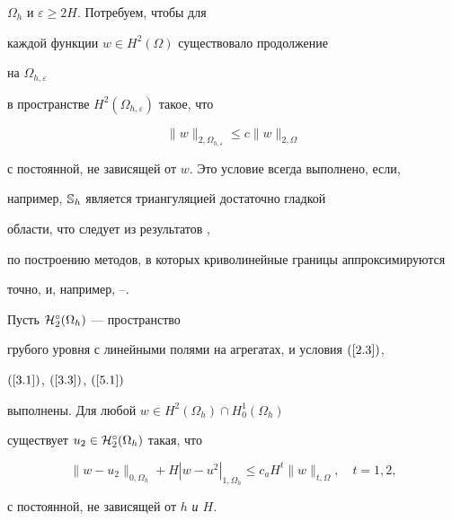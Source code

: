 $\Omega_h$ и $\varepsilon\ge 2H$. Потребуем, чтобы для


каждой функции $w\in H^2(\Omega)$ существовало продолжение


на $\Omega_{h,\varepsilon}$


в пространстве $H^2(\Omega_{h,\varepsilon})$ такое, что


\begin{equation}\label{5.2}


\|w\|_{{2,\Omega_{h,\varepsilon}}}\le c\|w\|_{{2,\Omega}}


\end{equation}


с постоянной, не зависящей от $w$. Это условие всегда выполнено, если,


например, $\Bbb{S}_h$ является триангуляцией достаточно гладкой


области, что следует из результатов \cite{[21]}, \cite{[20]}


по построению методов, в которых криволинейные границы аппроксимируются


точно, и, например, \cite{[1]}--\cite{[25]}.





\begin{lems}


Пусть ${\cal H}^\circ_2(\Omega_h)$ --- пространство


грубого уровня с линейными полями на агрегатах, и условия $(\ref{2.3})$,


$(\ref{3.1})$, $(\ref{3.3})$, $(\ref{5.1})$


выполнены. Для любой $w\in H^2(\Omega_h)\cap H^1_0(\Omega_h)$


существует $u_2\in {\cal H}^\circ_2(\Omega_h)$ такая, что


\begin{equation}\label{5.3}


\|w-u_2\|_{{0,\Omega_h}}+H|w-u^{2}|_{{1,\Omega_h}}\le c_a


H^t\|w\|_{{t,\Omega}},\quad t=1,2,


\end{equation}


с постоянной, не зависящей от $h$ \it и $H$.


\end{lems}





